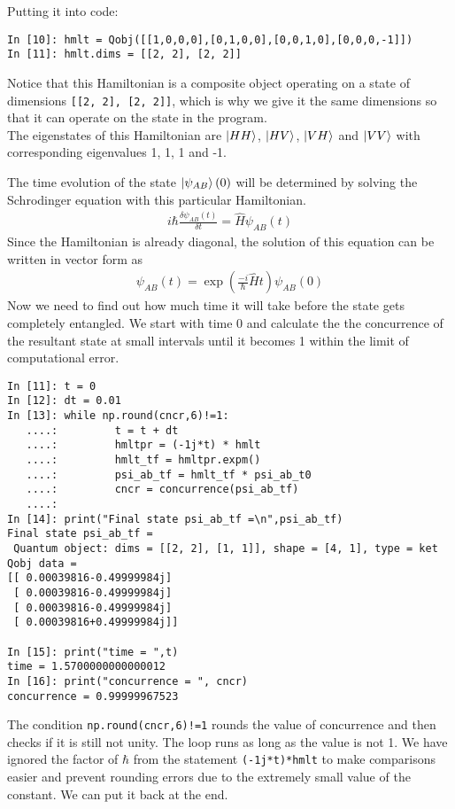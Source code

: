Putting it into code:
\begin{verbatim}
In [10]: hmlt = Qobj([[1,0,0,0],[0,1,0,0],[0,0,1,0],[0,0,0,-1]])
In [11]: hmlt.dims = [[2, 2], [2, 2]]
\end{verbatim}
Notice that this Hamiltonian is a composite object operating on a state of dimensions \texttt{[[2, 2], [2, 2]]}, which is why we give it the same dimensions so that it can operate on the state in the program.
\\The eigenstates of this Hamiltonian are $\ket{HH}$, $\ket{HV}$, $\ket{VH}$ and $\ket{VV}$ with corresponding eigenvalues 1, 1, 1 and -1.
\par The time evolution of the state $\ket{\psi_{AB}}(0)$ will be determined by solving the Schrodinger equation with this particular Hamiltonian.
\begin{align*}
i \hbar \frac{\delta \psi_{AB}(t)}{\delta t} = \hat{H} \psi_{AB}(t)
\end{align*}
Since the Hamiltonian is already diagonal, the solution of this equation can be written in vector form as
\begin{align*}
\psi_{AB}(t) = \exp \left( \frac{-i}{\hbar} \hat{H} t \right) \psi_{AB}(0)
\end{align*}
Now we need to find out how much time it will take before the state gets completely entangled. We start with time 0 and calculate the the concurrence of the resultant state at small intervals until it becomes 1 within the limit of computational error.
\begin{verbatim}
In [11]: t = 0
In [12]: dt = 0.01
In [13]: while np.round(cncr,6)!=1:
   ....:         t = t + dt
   ....:         hmltpr = (-1j*t) * hmlt
   ....:         hmlt_tf = hmltpr.expm()
   ....:         psi_ab_tf = hmlt_tf * psi_ab_t0
   ....:         cncr = concurrence(psi_ab_tf)
   ....: 
In [14]: print("Final state psi_ab_tf =\n",psi_ab_tf)
Final state psi_ab_tf =
 Quantum object: dims = [[2, 2], [1, 1]], shape = [4, 1], type = ket
Qobj data =
[[ 0.00039816-0.49999984j]
 [ 0.00039816-0.49999984j]
 [ 0.00039816-0.49999984j]
 [ 0.00039816+0.49999984j]]

In [15]: print("time = ",t)
time = 1.5700000000000012
In [16]: print("concurrence = ", cncr)
concurrence = 0.99999967523
\end{verbatim}
The condition \texttt{np.round(cncr,6)!=1} rounds the value of concurrence and then checks if it is still not unity. The loop runs as long as the value is not 1. We have ignored the factor of $\hbar$ from the statement \texttt{(-1j*t)*hmlt} to make comparisons easier and prevent rounding errors due to the extremely small value of the constant. We can put it back at the end.
